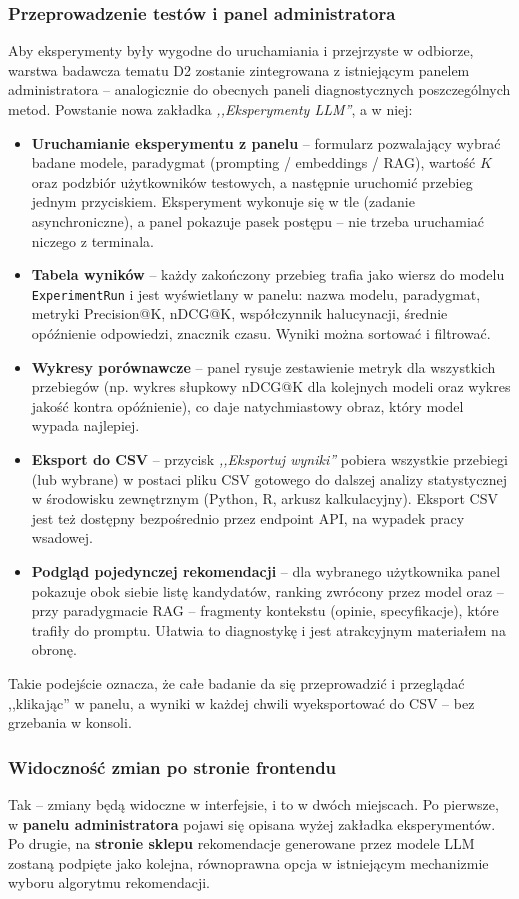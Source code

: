 \documentclass[12pt,a4paper]{article}
\newcommand{\topicsection}[1]{\subsubsection*{#1}}
\begin{document}
\topicsection{Przeprowadzenie testów i panel administratora}
Aby eksperymenty były wygodne do uruchamiania i przejrzyste w odbiorze, warstwa badawcza tematu D2 zostanie zintegrowana z istniejącym panelem administratora -- analogicznie do obecnych paneli diagnostycznych poszczególnych metod. Powstanie nowa zakładka \emph{,,Eksperymenty LLM''}, a w niej:

\begin{itemize}
\item \textbf{Uruchamianie eksperymentu z panelu} -- formularz pozwalający wybrać badane modele, paradygmat (prompting / embeddings / RAG), wartość $K$ oraz podzbiór użytkowników testowych, a następnie uruchomić przebieg jednym przyciskiem. Eksperyment wykonuje się w tle (zadanie asynchroniczne), a panel pokazuje pasek postępu -- nie trzeba uruchamiać niczego z terminala.
\item \textbf{Tabela wyników} -- każdy zakończony przebieg trafia jako wiersz do modelu \texttt{ExperimentRun} i jest wyświetlany w panelu: nazwa modelu, paradygmat, metryki Precision@K, nDCG@K, współczynnik halucynacji, średnie opóźnienie odpowiedzi, znacznik czasu. Wyniki można sortować i filtrować.
\item \textbf{Wykresy porównawcze} -- panel rysuje zestawienie metryk dla wszystkich przebiegów (np. wykres słupkowy nDCG@K dla kolejnych modeli oraz wykres jakość kontra opóźnienie), co daje natychmiastowy obraz, który model wypada najlepiej.
\item \textbf{Eksport do CSV} -- przycisk \emph{,,Eksportuj wyniki''} pobiera wszystkie przebiegi (lub wybrane) w postaci pliku CSV gotowego do dalszej analizy statystycznej w środowisku zewnętrznym (Python, R, arkusz kalkulacyjny). Eksport CSV jest też dostępny bezpośrednio przez endpoint API, na wypadek pracy wsadowej.
\item \textbf{Podgląd pojedynczej rekomendacji} -- dla wybranego użytkownika panel pokazuje obok siebie listę kandydatów, ranking zwrócony przez model oraz -- przy paradygmacie RAG -- fragmenty kontekstu (opinie, specyfikacje), które trafiły do promptu. Ułatwia to diagnostykę i jest atrakcyjnym materiałem na obronę.
\end{itemize}

Takie podejście oznacza, że całe badanie da się przeprowadzić i przeglądać ,,klikając'' w panelu, a wyniki w każdej chwili wyeksportować do CSV -- bez grzebania w konsoli.

\topicsection{Widoczność zmian po stronie frontendu}
Tak -- zmiany będą widoczne w interfejsie, i to w dwóch miejscach. Po pierwsze, w \textbf{panelu administratora} pojawi się opisana wyżej zakładka eksperymentów. Po drugie, na \textbf{stronie sklepu} rekomendacje generowane przez modele LLM zostaną podpięte jako kolejna, równoprawna opcja w istniejącym mechanizmie wyboru algorytmu rekomendacji.
\end{document}
